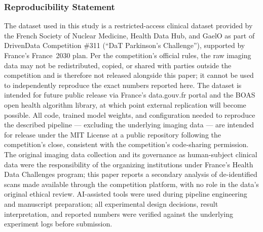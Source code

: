 \documentclass[10pt]{article}
\begin{document}
\subsubsection*{Reproducibility Statement}

The dataset used in this study is a restricted-access clinical dataset provided by the French Society of Nuclear Medicine, Health Data Hub, and GaelO as part of DrivenData Competition \#311 (``DaT Parkinson's Challenge''), supported by France's France~2030 plan. Per the competition's official rules, the raw imaging data may not be redistributed, copied, or shared with parties outside the competition and is therefore not released alongside this paper; it cannot be used to independently reproduce the exact numbers reported here. The dataset is intended for future public release via France's data.gouv.fr portal and the BOAS open health algorithm library, at which point external replication will become possible. All code, trained model weights, and configuration needed to reproduce the described pipeline --- excluding the underlying imaging data --- are intended for release under the MIT License at a public repository following the competition's close, consistent with the competition's code-sharing permission. The original imaging data collection and its governance as human-subject clinical data were the responsibility of the organizing institutions under France's Health Data Challenges program; this paper reports a secondary analysis of de-identified scans made available through the competition platform, with no role in the data's original ethical review. AI-assisted tools were used during pipeline engineering and manuscript preparation; all experimental design decisions, result interpretation, and reported numbers were verified against the underlying experiment logs before submission.
\end{document}
